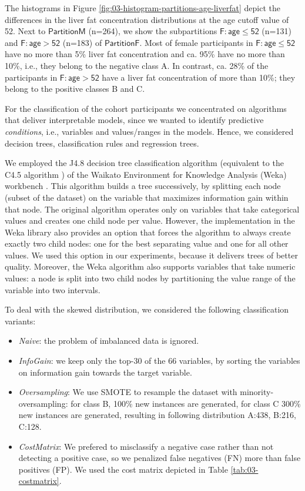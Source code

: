 \documentclass[
  oneside]{book}
\providecommand{\tightlist}{%
  \setlength{\itemsep}{0pt}\setlength{\parskip}{0pt}}
\begin{document}
The histograms in Figure \ref{fig:03-histogram-partitions-age-liverfat} depict the differences in the liver fat concentration distributions at the age cutoff value of 52.
Next to \(\mathsf{PartitionM}\) (n=264), we show the subpartitions \(\mathsf{F:age\leq{}52}\) (n=131) and \(\mathsf{F:age>52}\) (n=183) of \(\mathsf{PartitionF}\).
Most of female participants in \(\mathsf{F:age\leq{}52}\) have no more than 5\% liver fat concentration and ca. 95\% have no more than 10\%, i.e., they belong to the negative class A.
In contrast, ca. 28\% of the participants in \(\mathsf{F:age>52}\) have a liver fat concentration of more than 10\%; they belong to the positive classes B and C.

For the classification of the cohort participants we concentrated on algorithms that deliver interpretable models, since we wanted to identify predictive \emph{conditions}, i.e., variables and values/ranges in the models.
Hence, we considered decision trees, classification rules and regression trees.

We employed the J4.8 decision tree classification algorithm (equivalent to the C4.5 algorithm \autocite{Q92}) of the Waikato Environment for Knowledge Analysis (Weka) workbench \autocite{FrankEtAl:Weka2016}.
This algorithm builds a tree successively, by splitting each node (subset of the dataset) on the variable that maximizes information gain within that node.
The original algorithm operates only on variables that take categorical values and creates one child node per value.
However, the implementation in the Weka library also provides an option that forces the algorithm to always create exactly two child nodes: one for the best separating value and one for all other values.
We used this option in our experiments, because it delivers trees of better quality.
Moreover, the Weka algorithm also supports variables that take numeric values:
a node is split into two child nodes by partitioning the value range of the variable into two intervals.

To deal with the skewed distribution, we considered the following classification variants:

\begin{itemize}
\tightlist
\item
  \emph{Naive}: the problem of imbalanced data is ignored.
\item
  \emph{InfoGain}: we keep only the top-30 of the 66 variables, by sorting the variables on information gain towards the target variable.
\item
  \emph{Oversampling}: We use SMOTE \autocite{CBHea02} to resample the dataset with minority-oversampling: for class B, 100\% new instances are generated, for class C 300\% new instances are generated, resulting in following distribution A:438, B:216, C:128.
\item
  \emph{CostMatrix}: We prefered to misclassify a negative case rather than not detecting a positive case, so we penalized false negatives (FN) more than false positives (FP).
  We used the cost matrix depicted in Table \ref{tab:03-costmatrix}.
\end{itemize}
\end{document}
